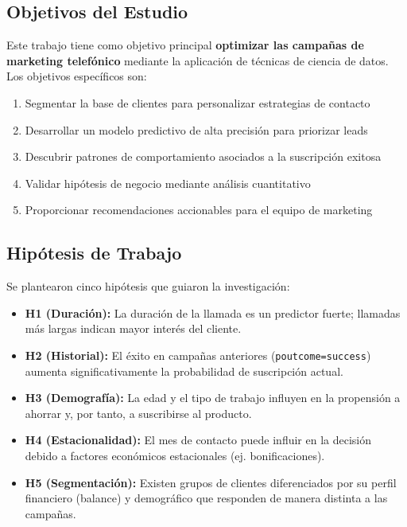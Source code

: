 \documentclass[12pt,letterpaper]{article}
\begin{document}
\subsection{Objetivos del Estudio}

Este trabajo tiene como objetivo principal \textbf{optimizar las campañas de marketing telefónico} mediante la aplicación de técnicas de ciencia de datos. Los objetivos específicos son:

\begin{enumerate}
    \item Segmentar la base de clientes para personalizar estrategias de contacto
    \item Desarrollar un modelo predictivo de alta precisión para priorizar leads
    \item Descubrir patrones de comportamiento asociados a la suscripción exitosa
    \item Validar hipótesis de negocio mediante análisis cuantitativo
    \item Proporcionar recomendaciones accionables para el equipo de marketing
\end{enumerate}

\subsection{Hipótesis de Trabajo}

Se plantearon cinco hipótesis que guiaron la investigación:

\begin{itemize}
    \item \textbf{H1 (Duración):} La duración de la llamada es un predictor fuerte; llamadas más largas indican mayor interés del cliente.
    \item \textbf{H2 (Historial):} El éxito en campañas anteriores (\texttt{poutcome=success}) aumenta significativamente la probabilidad de suscripción actual.
    \item \textbf{H3 (Demografía):} La edad y el tipo de trabajo influyen en la propensión a ahorrar y, por tanto, a suscribirse al producto.
    \item \textbf{H4 (Estacionalidad):} El mes de contacto puede influir en la decisión debido a factores económicos estacionales (ej. bonificaciones).
    \item \textbf{H5 (Segmentación):} Existen grupos de clientes diferenciados por su perfil financiero (balance) y demográfico que responden de manera distinta a las campañas.
\end{itemize}
\end{document}
